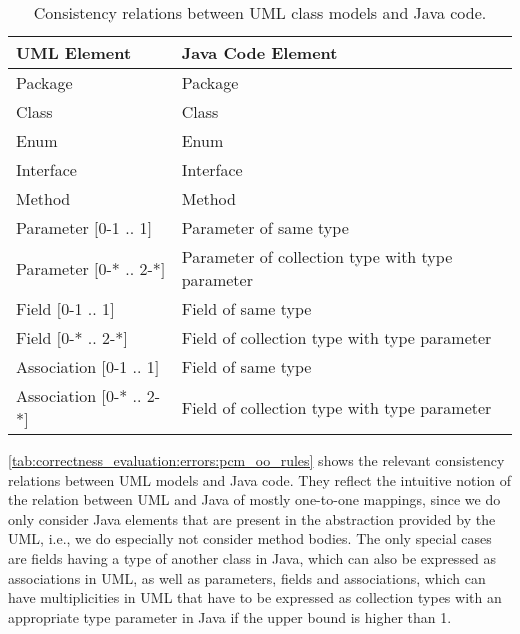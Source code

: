\begin{table}
	\centering 
    \small
    \renewcommand{\arraystretch}{1.4}
	\begin{tabular}{p{3cm} p{6.8cm}}
		\toprule
        \textbf{\gls{UML} Element}  & \textbf{Java Code Element} \\
        \midrule
        Package                         & Package\\
		Class                           & Class\\
		Enum		                    & Enum \\
		Interface		   	            & Interface \\
        Method                          & Method \\
        Parameter $[$0-1 .. 1$]$        & Parameter of same type \\
        Parameter $[$0-* .. 2-*$]$      & Parameter of collection type with type parameter \\
        Field $[$0-1 .. 1$]$            & Field of same type\\
        Field $[$0-* .. 2-*$]$          & Field of collection type with type parameter\\
        Association $[$0-1 .. 1$]$      & Field of same type\\
        Association $[$0-* .. 2-*$]$    & Field of collection type with type parameter\\
		\bottomrule
	\end{tabular}
	\caption[Consistency relation between UML and Java]{Consistency relations between \gls{UML} class models and Java code.}
	\label{tab:correctness_evaluation:errors:uml_java_rules}
\end{table}

\autoref{tab:correctness_evaluation:errors:pcm_oo_rules} shows the relevant consistency relations between \gls{UML} models and Java code.
They reflect the intuitive notion of the relation between \gls{UML} and Java of mostly one-to-one mappings, since we do only consider Java elements that are present in the abstraction provided by the \gls{UML}, i.e., we do especially not consider method bodies.
The only special cases are fields having a type of another class in Java, which can also be expressed as associations in \gls{UML}, as well as parameters, fields and associations, which can have multiplicities in \gls{UML} that have to be expressed as collection types with an appropriate type parameter in Java if the upper bound is higher than 1.

